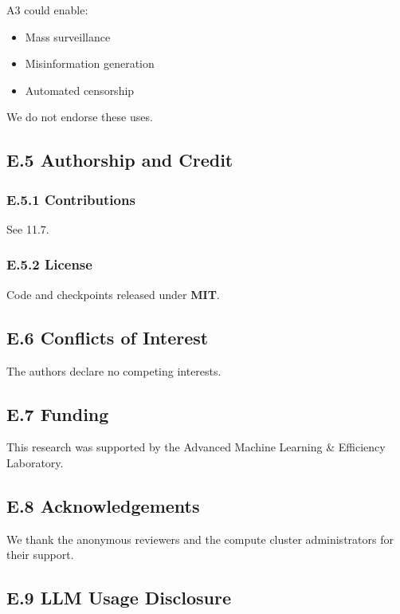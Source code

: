 A3 could enable:

\begin{itemize}
\item Mass surveillance
\item Misinformation generation
\item Automated censorship

\end{itemize}
We do not endorse these uses.

\subsection{E.5 Authorship and Credit}

\subsubsection{E.5.1 Contributions}

See  11.7.

\subsubsection{E.5.2 License}

Code and checkpoints released under \textbf{MIT}.

\subsection{E.6 Conflicts of Interest}

The authors declare no competing interests.

\subsection{E.7 Funding}

This research was supported by the Advanced Machine Learning \& Efficiency Laboratory.

\subsection{E.8 Acknowledgements}

We thank the anonymous reviewers and the compute cluster administrators for their support.

\subsection{E.9 LLM Usage Disclosure}

